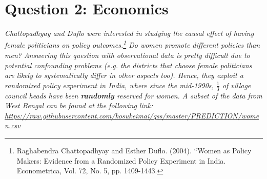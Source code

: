 \documentclass[12pt,letterpaper]{article}
\begin{document}
\newpage

\section*{Question 2: Economics}
\textit{Chattopadhyay and Duflo were interested in studying the causal effect of having female politicians on policy outcomes.\footnote{Raghabendra Chattopadhyay and Esther Duflo. (2004). ``Women as Policy Makers: Evidence from a Randomized Policy Experiment in India. Econometrica, Vol. 72, No. 5, pp. 1409-1443.} Do women promote different policies than men? Answering this question with observational data is pretty difficult due to potential confounding problems (e.g. the districts that choose female politicians are likely to systematically differ in other aspects too). Hence, they exploit a randomized policy experiment in India, where since the mid-1990s, $\frac{1}{3}$ of village council heads have been {\bf{randomly}} reserved for women. A subset of the data from West Bengal can be found at the following link: \url{https://raw.githubusercontent.com/kosukeimai/qss/master/PREDICTION/women.csv}}\\
\end{document}
